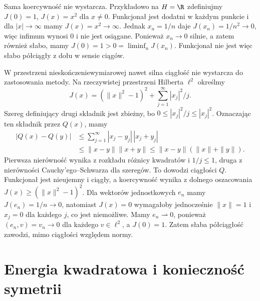 \begin{uwaga}
Sama koercywność nie wystarcza. Przykładowo na $H=\R$
zdefiniujmy $J(0)=1$, $J(x)=x^2$ dla $x\ne0$.
Funkcjonał jest dodatni w każdym punkcie i dla
$|x|\to\infty$ mamy $J(x)=x^2\to\infty$.
Jednak $x_n=1/n$ daje $J(x_n)=1/n^2\to0$,
więc infimum wynosi $0$ i nie jest osiągane.
Ponieważ $x_n\to0$ silnie, a zatem również słabo,
mamy $J(0)=1>0=\liminf_nJ(x_n)$.
Funkcjonał nie jest więc słabo półciągły z dołu
w sensie ciągów.

W przestrzeni nieskończeniewymiarowej nawet silna
ciągłość nie wystarcza do zastosowania metody.
Na rzeczywistej przestrzeni Hilberta $\ell^2$
określmy
\[
 J(x)=(\|x\|^2-1)^2+\sum_{j=1}^\infty |x_j|^2/j.
\]
Szereg definiujący drugi składnik jest zbieżny,
bo $0\le |x_j|^2/j\le |x_j|^2$.
Oznaczając ten składnik przez $Q(x)$, mamy
\[
 \begin{aligned}
 |Q(x)-Q(y)|&\le\sum_{j=1}^\infty |x_j-y_j|\,|x_j+y_j|\\
 &\le\|x-y\|\|x+y\|\le\|x-y\|(\|x\|+\|y\|).
 \end{aligned}
\]
Pierwsza nierówność wynika z rozkładu różnicy
kwadratów i $1/j\le1$, druga z nierówności
Cauchy'ego--Schwarza dla szeregów.
To dowodzi ciągłości $Q$. Funkcjonał jest nieujemny
i ciągły, a koercywność wynika z dolnego oszacowania
$J(x)\ge(\|x\|^2-1)^2$. Dla wektorów jednostkowych
$e_n$ mamy $J(e_n)=1/n\to0$, natomiast $J(x)=0$
wymagałoby jednocześnie $\|x\|=1$ i $x_j=0$
dla każdego $j$, co jest niemożliwe.
Mamy $e_n\rightharpoonup0$, ponieważ
$(e_n,v)=v_n\to0$ dla każdego $v\in\ell^2$,
a $J(0)=1$. Zatem słaba półciągłość zawodzi,
mimo ciągłości względem normy.
\end{uwaga}

\section{Energia kwadratowa i konieczność symetrii}
\label{sec:pde11-energy}

